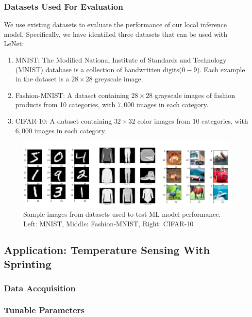 \documentclass[twoside]{report}
\begin{document}
\subsubsection{Datasets Used For Evaluation}
We use existing datasets to evaluate the performance of our local inference model. Specifically, 
we have identified three datasets that can be used with LeNet:
\begin{enumerate}
    \item MNIST: The Modified National Institute of Standards and Technology (MNIST) database 
          is a collection of handwritten digits($0-9$). Each example in the dataset is a $28\times28$ 
          greyscale image.
    \item Fashion-MNIST: A dataset containing $28\times28$ grayscale images of fashion products 
    from 10 categories, with $7,000$ images in each category.
    \item CIFAR-10: A dataset containing $32\times32$ color images from 10 categories, 
    with $6,000$ images in each category.
\end{enumerate}

\begin{figure}[ht]
    \centering
    \includegraphics[width=1.0\linewidth]{method/datasets.png}
    \caption{Sample images from datasets used to test ML model performance. \\Left: MNIST, Middle: Fashion-MNIST, Right: CIFAR-10}
    \label{fig:datasets}
\end{figure}

\subsection{Application: Temperature Sensing With Sprinting}
\subsubsection{Data Accquisition}
\subsubsection{Tunable Parameters}
 
\end{document}
